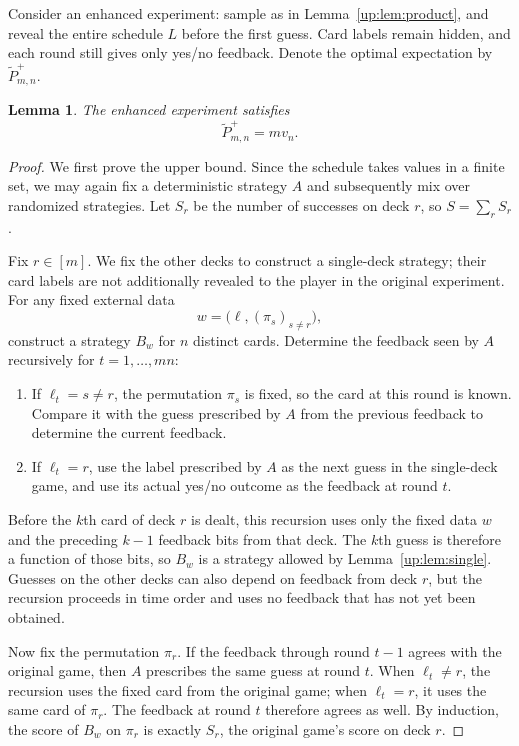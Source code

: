 \documentclass[11pt,reqno]{amsart}
\numberwithin{equation}{section}
\newtheorem{lemma}[theorem]{Lemma}
\theoremstyle{remark}
\theoremstyle{definition}
\begin{document}
Consider an enhanced experiment: sample as in Lemma~\ref{up:lem:product}, and reveal the entire schedule $L$ before the first guess. Card labels remain hidden, and each round still gives only yes/no feedback. Denote the optimal expectation by $\widetilde P^+_{m,n}$.
\begin{lemma}\label{up:lem:additive}
The enhanced experiment satisfies
\[
 \widetilde P^+_{m,n}=m v_n.
\]
\end{lemma}
\begin{proof}
We first prove the upper bound. Since the schedule takes values in a finite set, we may again fix a deterministic strategy $A$ and subsequently mix over randomized strategies. Let $S_r$ be the number of successes on deck $r$, so $S=\sum_rS_r$.

Fix $r\in[m]$. We fix the other decks to construct a single-deck strategy; their card labels are not additionally revealed to the player in the original experiment. For any fixed external data
\[
 w=\bigl(\ell,(\pi_s)_{s\ne r}\bigr),
\]
construct a strategy $B_w$ for $n$ distinct cards. Determine the feedback seen by $A$ recursively for $t=1,\ldots,mn$:
\begin{enumerate}
\item If $\ell_t=s\ne r$, the permutation $\pi_s$ is fixed, so the card at this round is known. Compare it with the guess prescribed by $A$ from the previous feedback to determine the current feedback.
\item If $\ell_t=r$, use the label prescribed by $A$ as the next guess in the single-deck game, and use its actual yes/no outcome as the feedback at round $t$.
\end{enumerate}
Before the $k$th card of deck $r$ is dealt, this recursion uses only the fixed data $w$ and the preceding $k-1$ feedback bits from that deck. The $k$th guess is therefore a function of those bits, so $B_w$ is a strategy allowed by Lemma~\ref{up:lem:single}. Guesses on the other decks can also depend on feedback from deck $r$, but the recursion proceeds in time order and uses no feedback that has not yet been obtained.

Now fix the permutation $\pi_r$. If the feedback through round $t-1$ agrees with the original game, then $A$ prescribes the same guess at round $t$. When $\ell_t\ne r$, the recursion uses the fixed card from the original game; when $\ell_t=r$, it uses the same card of $\pi_r$. The feedback at round $t$ therefore agrees as well. By induction, the score of $B_w$ on $\pi_r$ is exactly $S_r$, the original game's score on deck $r$.


\end{proof}
\end{document}
